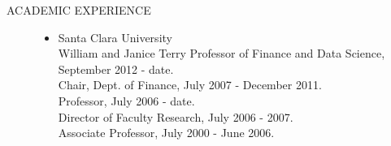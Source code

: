 \documentclass{article}
\begin{document}
\begin{description} 
\item[ACADEMIC EXPERIENCE] \mbox{}

\begin{itemize}
\setlength\itemsep{-0.1em}

\item Santa Clara University\\
\hspace*{0.25in}William and Janice Terry Professor of Finance and Data Science, September 2012 - date.\\
\hspace*{0.25in}Chair, Dept. of Finance, July 2007 - December 2011.\\
\hspace*{0.25in}Professor, July 2006 - date.\\
\hspace*{0.25in}Director of Faculty Research, July 2006 - 2007.\\
\hspace*{0.25in}Associate Professor, July 2000 - June 2006.


\end{itemize}
\end{description}
\end{document}
